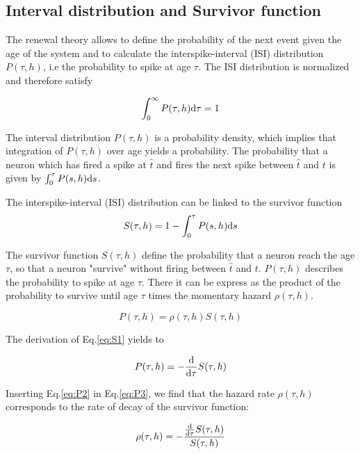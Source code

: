 \documentclass[12pt,twoside]{report}
\def \dd  {{\rm d}}
\begin{document}
\subsection{Interval distribution and Survivor function}

The renewal theory allows to define the probability of the next event given the age of the system and to calculate the interspike-interval (ISI) distribution $P(\tau,h)$, i.e the probability to spike at age $\tau$. The ISI distribution is normalized and therefore satisfy

\begin{equation}
\label{eq:Pnorm}
\int_0^\infty P(\tau,h)\dd\tau=1 
\end{equation}

The interval distribution $P(\tau,h)$ is a probability density, which implies that integration of $P(\tau,h)$ over age yields a probability. The probability that a neuron which has fired a spike at $\hat{t}$ and fires the next spike between $\hat{t}$ and $t$ is given by $\int_0^\tau P(s,h) \dd s$.

The interspike-interval (ISI) distribution can be linked to the survivor function
\begin{equation}
\label{eq:S1}
S(\tau,h)=1-\int_0^\tau P(s,h) \dd s
\end{equation}

The survivor function $S(\tau,h)$ define the probability that a neuron reach the age $\tau$, so that a neuron "survive" without firing between $\hat{t}$ and $t$. $P(\tau,h)$ describes the probability to spike at age $\tau$. There it can be express as the product of the probability to survive until age $\tau$ times the momentary hazard $\rho(\tau,h)$. 

\begin{equation}
\label{eq:P2}
P(\tau,h)=\rho(\tau,h)S(\tau,h)
\end{equation}

The derivation of Eq.\eqref{eq:S1} yields to 

\begin{equation}
\label{eq:P3}
P(\tau,h)=-\frac{\dd}{\dd \tau}S(\tau,h)
\end{equation}

Inserting Eq.\eqref{eq:P2} in Eq.\eqref{eq:P3}, we find that the hazard rate $\rho(\tau,h)$ corresponds to the rate of decay of the survivor function:

\begin{equation}
\label{eq:ratedecays}
\rho(\tau,h)=-\frac{\frac{\dd}{\dd \tau}S(\tau,h)}{S(\tau,h)}
\end{equation}
\end{document}
